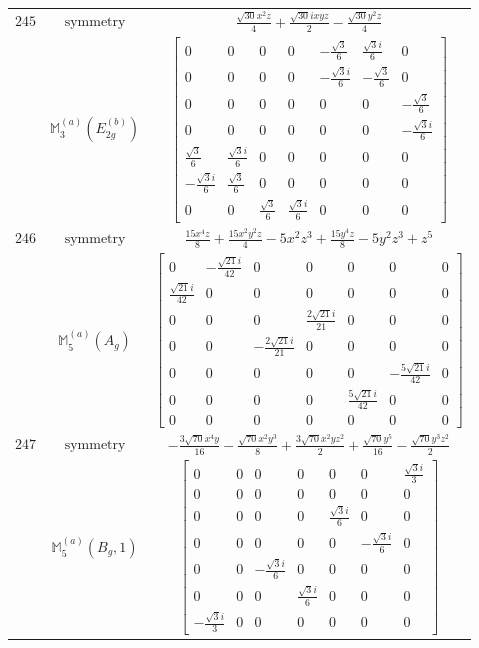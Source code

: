 \documentclass[fleqn,8pt,landscape]{jsarticle}
\begin{document}
\begin{longtable}{ccc}
$ 245 $ & $ \text{symmetry} $ & $ \frac{\sqrt{30} x^{2} z}{4} + \frac{\sqrt{30} i x y z}{2} - \frac{\sqrt{30} y^{2} z}{4} $ \\
$  $ & $ \mathbb{M}_{3}^{(a)}(E_{2g}^{(b)}) $ & $ \begin{bmatrix} 0 & 0 & 0 & 0 & - \frac{\sqrt{3}}{6} & \frac{\sqrt{3} i}{6} & 0 \\ 0 & 0 & 0 & 0 & - \frac{\sqrt{3} i}{6} & - \frac{\sqrt{3}}{6} & 0 \\ 0 & 0 & 0 & 0 & 0 & 0 & - \frac{\sqrt{3}}{6} \\ 0 & 0 & 0 & 0 & 0 & 0 & - \frac{\sqrt{3} i}{6} \\ \frac{\sqrt{3}}{6} & \frac{\sqrt{3} i}{6} & 0 & 0 & 0 & 0 & 0 \\ - \frac{\sqrt{3} i}{6} & \frac{\sqrt{3}}{6} & 0 & 0 & 0 & 0 & 0 \\ 0 & 0 & \frac{\sqrt{3}}{6} & \frac{\sqrt{3} i}{6} & 0 & 0 & 0 \end{bmatrix} $ \\ \hline
$ 246 $ & $ \text{symmetry} $ & $ \frac{15 x^{4} z}{8} + \frac{15 x^{2} y^{2} z}{4} - 5 x^{2} z^{3} + \frac{15 y^{4} z}{8} - 5 y^{2} z^{3} + z^{5} $ \\
$  $ & $ \mathbb{M}_{5}^{(a)}(A_{g}) $ & $ \begin{bmatrix} 0 & - \frac{\sqrt{21} i}{42} & 0 & 0 & 0 & 0 & 0 \\ \frac{\sqrt{21} i}{42} & 0 & 0 & 0 & 0 & 0 & 0 \\ 0 & 0 & 0 & \frac{2 \sqrt{21} i}{21} & 0 & 0 & 0 \\ 0 & 0 & - \frac{2 \sqrt{21} i}{21} & 0 & 0 & 0 & 0 \\ 0 & 0 & 0 & 0 & 0 & - \frac{5 \sqrt{21} i}{42} & 0 \\ 0 & 0 & 0 & 0 & \frac{5 \sqrt{21} i}{42} & 0 & 0 \\ 0 & 0 & 0 & 0 & 0 & 0 & 0 \end{bmatrix} $ \\ \hline
$ 247 $ & $ \text{symmetry} $ & $ - \frac{3 \sqrt{70} x^{4} y}{16} - \frac{\sqrt{70} x^{2} y^{3}}{8} + \frac{3 \sqrt{70} x^{2} y z^{2}}{2} + \frac{\sqrt{70} y^{5}}{16} - \frac{\sqrt{70} y^{3} z^{2}}{2} $ \\
$  $ & $ \mathbb{M}_{5}^{(a)}(B_{g},1) $ & $ \begin{bmatrix} 0 & 0 & 0 & 0 & 0 & 0 & \frac{\sqrt{3} i}{3} \\ 0 & 0 & 0 & 0 & 0 & 0 & 0 \\ 0 & 0 & 0 & 0 & \frac{\sqrt{3} i}{6} & 0 & 0 \\ 0 & 0 & 0 & 0 & 0 & - \frac{\sqrt{3} i}{6} & 0 \\ 0 & 0 & - \frac{\sqrt{3} i}{6} & 0 & 0 & 0 & 0 \\ 0 & 0 & 0 & \frac{\sqrt{3} i}{6} & 0 & 0 & 0 \\ - \frac{\sqrt{3} i}{3} & 0 & 0 & 0 & 0 & 0 & 0 \end{bmatrix} $ \\ \hline

\end{longtable}
\end{document}
